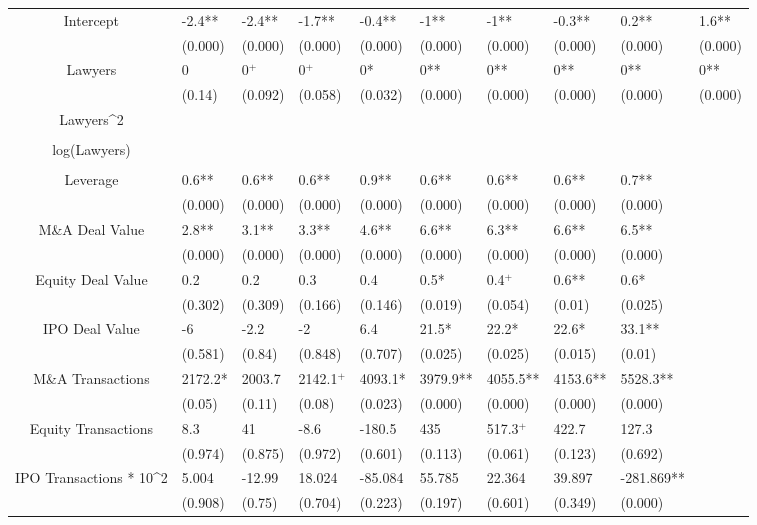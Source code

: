 \documentclass{article}
\begin{document}
\begin{table}[H]
\begin{tabular}{|clllllllll|}
Intercept & -2.4** & -2.4** & -1.7** & -0.4** & -1** & -1** & -0.3** & 0.2** & 1.6** \\
   & (0.000) & (0.000) & (0.000) & (0.000) & (0.000) & (0.000) & (0.000) & (0.000) & (0.000) \\
  Lawyers & 0 & 0$^{+}$ & 0$^{+}$ & 0* & 0** & 0** & 0** & 0** & 0** \\
   & (0.14) & (0.092) & (0.058) & (0.032) & (0.000) & (0.000) & (0.000) & (0.000) & (0.000) \\
  Lawyers^2 &  &  &  &  &  &  &  &  &  \\
   &  &  &  &  &  &  &  &  &  \\
  log(Lawyers) &  &  &  &  &  &  &  &  &  \\
   &  &  &  &  &  &  &  &  &  \\
  Leverage & 0.6** & 0.6** & 0.6** & 0.9** & 0.6** & 0.6** & 0.6** & 0.7** &  \\
   & (0.000) & (0.000) & (0.000) & (0.000) & (0.000) & (0.000) & (0.000) & (0.000) &  \\
  M\&A Deal Value & 2.8** & 3.1** & 3.3** & 4.6** & 6.6** & 6.3** & 6.6** & 6.5** &  \\
   & (0.000) & (0.000) & (0.000) & (0.000) & (0.000) & (0.000) & (0.000) & (0.000) &  \\
  Equity Deal Value & 0.2 & 0.2 & 0.3 & 0.4 & 0.5* & 0.4$^{+}$ & 0.6** & 0.6* &  \\
   & (0.302) & (0.309) & (0.166) & (0.146) & (0.019) & (0.054) & (0.01) & (0.025) &  \\
  IPO Deal Value & -6 & -2.2 & -2 & 6.4 & 21.5* & 22.2* & 22.6* & 33.1** &  \\
   & (0.581) & (0.84) & (0.848) & (0.707) & (0.025) & (0.025) & (0.015) & (0.01) &  \\
  M\&A Transactions & 2172.2* & 2003.7 & 2142.1$^{+}$ & 4093.1* & 3979.9** & 4055.5** & 4153.6** & 5528.3** &  \\
   & (0.05) & (0.11) & (0.08) & (0.023) & (0.000) & (0.000) & (0.000) & (0.000) &  \\
  Equity Transactions & 8.3 & 41 & -8.6 & -180.5 & 435 & 517.3$^{+}$ & 422.7 & 127.3 &  \\
   & (0.974) & (0.875) & (0.972) & (0.601) & (0.113) & (0.061) & (0.123) & (0.692) &  \\
  IPO Transactions * 10^2 & 5.004 & -12.99 & 18.024 & -85.084 & 55.785 & 22.364 & 39.897 & -281.869** &  \\
   & (0.908) & (0.75) & (0.704) & (0.223) & (0.197) & (0.601) & (0.349) & (0.000) &  \\

\end{tabular}
\end{table}
\end{document}
